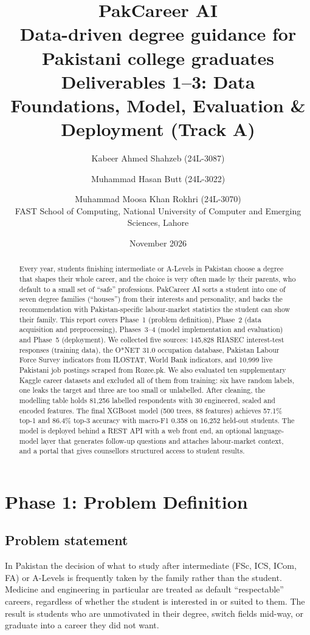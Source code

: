 \documentclass[11pt,a4paper]{article}
\title{\textbf{PakCareer AI}\\[2pt]
\large Data-driven degree guidance for Pakistani college graduates\\[2pt]
\normalsize Deliverables 1--3: Data Foundations, Model, Evaluation \& Deployment (Track A)}
\author{
Kabeer Ahmed Shahzeb (24L-3087) \and Muhammad Hasan Butt (24L-3022) \and Muhammad Moosa Khan Rokhri (24L-3070)\\[4pt]
\small FAST School of Computing, National University of Computer and Emerging Sciences, Lahore
}
\date{November 2026}
\begin{document}
\maketitle

\begin{abstract}
Every year, students finishing intermediate or A-Levels in Pakistan choose a degree that shapes
their whole career, and the choice is very often made by their parents, who default to a small set
of ``safe'' professions. PakCareer AI sorts a student into one of seven degree families
(``houses'') from their interests and personality, and backs the recommendation with
Pakistan-specific labour-market statistics the student can show their family. This report covers
Phase~1 (problem definition), Phase~2 (data acquisition and preprocessing), Phases~3--4 (model
implementation and evaluation) and Phase~5 (deployment). We collected five
sources: 145,828 RIASEC interest-test responses (training data), the O*NET 31.0 occupation
database, Pakistan Labour Force Survey indicators from ILOSTAT, World Bank indicators, and
10,999 live Pakistani job postings scraped from Rozee.pk. We also evaluated ten supplementary
Kaggle career datasets and excluded all of them from training: six have random labels, one leaks
the target and three are too small or unlabelled. After cleaning, the modelling table holds
81,256 labelled respondents with 30 engineered, scaled and encoded features. The final XGBoost
model (500 trees, 88 features) achieves 57.1\% top-1 and 86.4\% top-3 accuracy with macro-F1
0.358 on 16,252 held-out students. The model is deployed behind a REST API with a web front end,
an optional language-model layer that generates follow-up questions and attaches labour-market
context, and a portal that gives counsellors structured access to student results.
\end{abstract}

\section{Phase 1: Problem Definition}

\subsection{Problem statement}
In Pakistan the decision of what to study after intermediate (FSc, ICS, ICom, FA) or A-Levels is
frequently taken by the family rather than the student. Medicine and engineering in particular are
treated as default ``respectable'' careers, regardless of whether the student is interested in or
suited to them. The result is students who are unmotivated in their degree, switch fields
mid-way, or graduate into a career they did not want.
\end{document}
